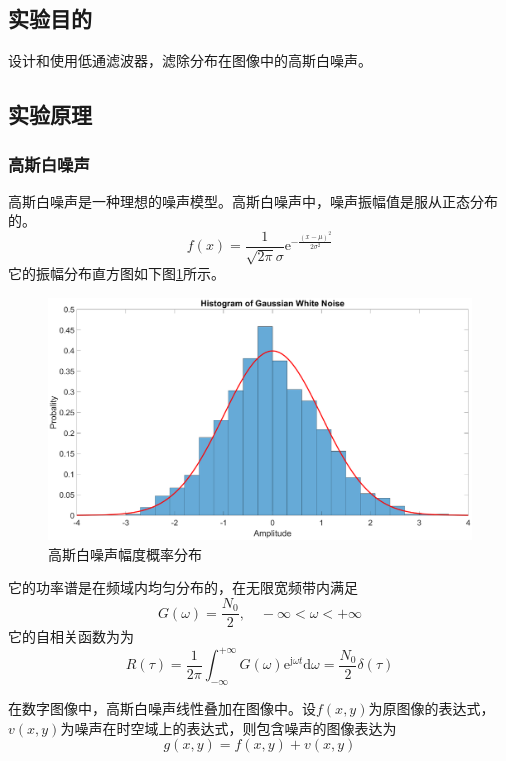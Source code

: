 \subsection{实验目的}
设计和使用低通滤波器，滤除分布在图像中的高斯白噪声。
\subsection{实验原理}
\subsubsection{高斯白噪声}
高斯白噪声是一种理想的噪声模型。高斯白噪声中，噪声振幅值是服从正态分布的。
\[ f(x)=\frac{1}{\sqrt{2\pi}\sigma}\mathrm{e}^{-\frac{(x-\mu)^2}{2\sigma^2}} \]
它的振幅分布直方图如下图\ref{fig:gwnhistogram}所示。
\begin{figure}[H]
	\centering
	\includegraphics[width=0.7\linewidth]{figure/gwn_histogram}
	\caption{高斯白噪声幅度概率分布}
	\label{fig:gwnhistogram}
\end{figure}
它的功率谱是在频域内均匀分布的，在无限宽频带内满足
\[ G(\omega) = \frac{N_0}{2},\quad -\infty<\omega<+\infty \]
它的自相关函数为为
\[ R(\tau) = \frac{1}{2\pi}\int_{-\infty}^{+\infty}G(\omega)\mathrm{e}^{\mathrm{j}\omega t}\mathrm{d}\omega=\frac{N_0}{2}\delta(\tau) \]

在数字图像中，高斯白噪声线性叠加在图像中。设$f(x, y)$为原图像的表达式，$v(x, y)$为噪声在时空域上的表达式，则包含噪声的图像表达为
\[ g(x, y) = f(x, y) + v(x, y)\]
